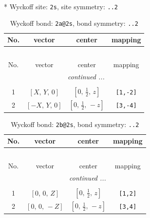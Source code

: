 \documentclass[fleqn,8pt]{jsarticle}
\begin{document}
* Wyckoff site: {\tt 2s}, site symmetry: {\tt ..2}
\renewcommand{\arraystretch}{1.2}
\begin{longtable}{cccc}
\caption{Wyckoff bond: {\tt 2a@2s}, bond symmetry: {\tt ..2}}
 \\
 \hline \hline
No. & vector & center & mapping \\ \hline \endfirsthead

\multicolumn{3}{l}{\tablename\ \thetable{}} \\
 \hline \hline
No. & vector & center & mapping \\ \hline \endhead

 \hline \hline
\multicolumn{3}{r}{\footnotesize\it continued ...} \\ \endfoot

 \hline \hline
\multicolumn{3}{r}{} \\ \endlastfoot

1 & $\left[ X,\, Y,\, 0 \right]$ & $\left[ 0,\, \frac{1}{2},\, z \right]$ & {\tt [1,-2]} \\ \hline
2 & $\left[ - X,\, Y,\, 0 \right]$ & $\left[ 0,\, \frac{1}{2},\, - z \right]$ & {\tt [3,-4]} \\
\end{longtable}
\renewcommand{\arraystretch}{1.2}
\begin{longtable}{cccc}
\caption{Wyckoff bond: {\tt 2b@2s}, bond symmetry: {\tt ..2}}
 \\
 \hline \hline
No. & vector & center & mapping \\ \hline \endfirsthead

\multicolumn{3}{l}{\tablename\ \thetable{}} \\
 \hline \hline
No. & vector & center & mapping \\ \hline \endhead

 \hline \hline
\multicolumn{3}{r}{\footnotesize\it continued ...} \\ \endfoot

 \hline \hline
\multicolumn{3}{r}{} \\ \endlastfoot

1 & $\left[ 0,\, 0,\, Z \right]$ & $\left[ 0,\, \frac{1}{2},\, z \right]$ & {\tt [1,2]} \\ \hline
2 & $\left[ 0,\, 0,\, - Z \right]$ & $\left[ 0,\, \frac{1}{2},\, - z \right]$ & {\tt [3,4]} \\
\end{longtable}
\renewcommand{\arraystretch}{1.2}
\end{document}
